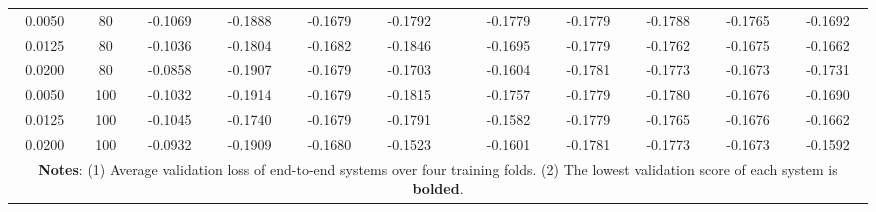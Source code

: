 \documentclass[10pt, twocolumn]{article}
\theoremstyle{plain}
\theoremstyle{definition}
\begin{document}
\begin{appendices}
\begin{table}[!ht]
\begin{tabular}{ccccccr@{}ccccc}
\midrule
0.0050 & 80 & -0.1069 & -0.1888 & -0.1679 & -0.1792 && -0.1779 & -0.1779 & -0.1788 & -0.1765 & -0.1692 \\
0.0125 & 80 & -0.1036 & -0.1804 & -0.1682 & -0.1846 && -0.1695 & -0.1779 & -0.1762 & -0.1675 & -0.1662 \\
0.0200 & 80 & -0.0858 & -0.1907 & -0.1679 & -0.1703 && -0.1604 & -0.1781 & -0.1773 & -0.1673 & -0.1731 \\
\midrule
0.0050 & 100 & -0.1032 & -0.1914 & -0.1679 & -0.1815 && -0.1757 & -0.1779 & -0.1780 & -0.1676 & -0.1690 \\
0.0125 & 100 & -0.1045 & -0.1740 & -0.1679 & -0.1791 && -0.1582 & -0.1779 & -0.1765 & -0.1676 & -0.1662 \\
0.0200 & 100 & -0.0932 & -0.1909 & -0.1680 & -0.1523 && -0.1601 & -0.1781 & -0.1773 & -0.1673 & -0.1592 \\
\bottomrule
\multicolumn{12}{p{0.99\linewidth}}{\small\rule{0pt}{3ex}\textbf{Notes}: (1) Average validation loss of end-to-end systems over four training folds. (2) The lowest validation score of each system is \textbf{bolded}.}\\
\end{tabular}
\label{table:validation}
\end{table}


\end{appendices}
\end{document}

